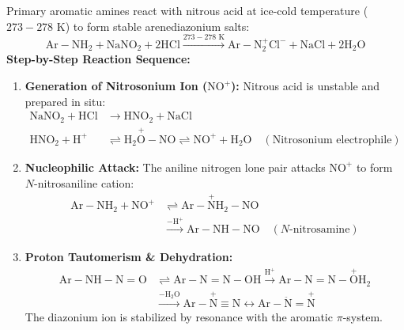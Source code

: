 \documentclass[10pt,twoside,openright]{book}
\begin{document}
\begin{conceptbox}
Primary aromatic amines react with nitrous acid at ice-cold temperature ($273-278\text{ K}$) to form stable arenediazonium salts:
\begin{equation}
  \mathrm{Ar-NH_2} + \mathrm{NaNO_2} + 2\mathrm{HCl} \xrightarrow{273-278\text{ K}} \mathrm{Ar-N_2^+Cl^-} + \mathrm{NaCl} + 2\mathrm{H_2O}
\end{equation}
\textbf{Step-by-Step Reaction Sequence:}
\begin{enumerate}[leftmargin=*]
  \item \textbf{Generation of Nitrosonium Ion ($\mathrm{NO^+}$):} Nitrous acid is unstable and prepared in situ:
  \begin{align*}
    \mathrm{NaNO_2} + \mathrm{HCl} &\to \mathrm{HNO_2} + \mathrm{NaCl}\\
    \mathrm{HNO_2} + \mathrm{H^+} &\rightleftharpoons \mathrm{H_2\overset{+}{O}-NO} \rightleftharpoons \mathrm{NO^+} + \mathrm{H_2O} \quad (\text{Nitrosonium electrophile})
  \end{align*}
  \item \textbf{Nucleophilic Attack:} The aniline nitrogen lone pair attacks $\mathrm{NO^+}$ to form $N$-nitrosaniline cation:
  \begin{align}
    \mathrm{Ar-NH_2} + \mathrm{NO^+} &\rightleftharpoons \mathrm{Ar-\overset{+}{N}H_2-NO} \\
    &\xrightarrow{-\mathrm{H^+}} \mathrm{Ar-NH-NO} \quad (N\text{-nitrosamine})
  \end{align}
  \item \textbf{Proton Tautomerism \& Dehydration:}
  \begin{align}
    \mathrm{Ar-NH-N=O} &\rightleftharpoons \mathrm{Ar-N=N-OH} \xrightarrow{\mathrm{H^+}} \mathrm{Ar-N=N-\overset{+}{O}H_2} \\
    &\xrightarrow{-\mathrm{H_2O}} \mathrm{Ar-\overset{+}{N}\equiv N} \longleftrightarrow \mathrm{Ar-\ddot{N}=\overset{+}{N}}
  \end{align}
  The diazonium ion is stabilized by resonance with the aromatic $\pi$-system.
\end{enumerate}
\end{conceptbox}
\end{document}
